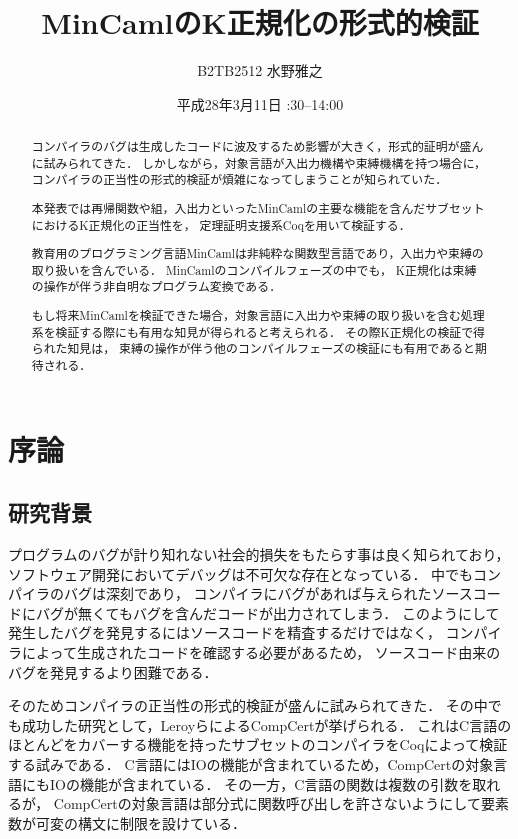 \documentclass{sumiilab-paper}
\title{MinCamlのK正規化の形式的検証}
\author{B2TB2512 水野雅之}
\institute{東北大学 工学部\\情報知能システム総合学科}%
\date{平成28年3月11日 \quad 13:30--14:00}
\begin{document}
\maketitle

\begin{abstract}
コンパイラのバグは生成したコードに波及するため影響が大きく，形式的証明が盛んに試みられてきた．
しかしながら，対象言語が入出力機構や束縛機構を持つ場合に，
コンパイラの正当性の形式的検証が煩雑になってしまうことが知られていた．

本発表では再帰関数や組，入出力といったMinCamlの主要な機能を含んだサブセットにおけるK正規化の正当性を，
定理証明支援系Coqを用いて検証する．

教育用のプログラミング言語MinCamlは非純粋な関数型言語であり，入出力や束縛の取り扱いを含んでいる．
MinCamlのコンパイルフェーズの中でも，
K正規化は束縛の操作が伴う非自明なプログラム変換である．

もし将来MinCamlを検証できた場合，対象言語に入出力や束縛の取り扱いを含む処理系を検証する際にも有用な知見が得られると考えられる．
その際K正規化の検証で得られた知見は，
束縛の操作が伴う他のコンパイルフェーズの検証にも有用であると期待される．
\end{abstract}

\tableofcontents


\chapter{序論}


\section{研究背景}
プログラムのバグが計り知れない社会的損失をもたらす事は良く知られており，
ソフトウェア開発においてデバッグは不可欠な存在となっている．
中でもコンパイラのバグは深刻であり，
コンパイラにバグがあれば与えられたソースコードにバグが無くてもバグを含んだコードが出力されてしまう．
このようにして発生したバグを発見するにはソースコードを精査するだけではなく，
コンパイラによって生成されたコードを確認する必要があるため，
ソースコード由来のバグを発見するより困難である．

そのためコンパイラの正当性の形式的検証が盛んに試みられてきた．
その中でも成功した研究として，LeroyらによるCompCert\cite{2006-Leroy-Blazy-Dargaye}が挙げられる．
これはC言語のほとんどをカバーする機能を持ったサブセットのコンパイラをCoqによって検証する試みである．
C言語にはIOの機能が含まれているため，CompCertの対象言語にもIOの機能が含まれている．
その一方，C言語の関数は複数の引数を取れるが，
CompCertの対象言語は部分式に関数呼び出しを許さないようにして要素数が可変の構文に制限を設けている．
\end{document}
